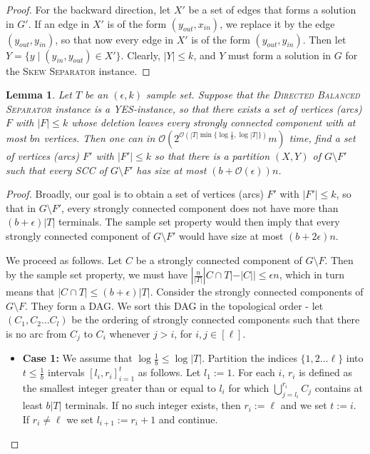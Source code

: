 \documentclass[11pt]{article}
\newtheorem{lemma}[theorem]{Lemma}
\newcommand{\OO}{\mathcal{O}}
\newcommand{\DB}{{\textsc{Directed Balanced Separator}}}
\newcommand{\SMC}{{\textsc{Skew Separator}}}
\begin{document}
{\begin{proof}
For the backward direction, let $X'$ be a set of edges that forms a solution in $G'$. If an edge in $X'$ is of the form $(y_{out}, x_{in})$, we replace it by the edge $(y_{out}, y_{in})$, so that now every edge in $X'$ is of the form $(y_{out}, y_{in})$. Then let $Y = \{y \mid (y_{in}, y_{out}) \in X'\}$. Clearly, $|Y| \leq k$, and $Y$ must form a solution in $G$ for the \SMC{} instance. 
\end{proof}







\begin{lemma}\label{lemma:aux}
Let $T$ be an $(\epsilon,k)$ sample set. Suppose that the \DB{} instance is a YES-instance, so that there exists a set of vertices (arcs) $F$ with $|F| \leq k$ whose deletion leaves every strongly connected component with at most $bn$ vertices. 
Then one can in $\OO(2^{\OO(|T|\min\{\log \frac{1}{b}, \log |T|\})}m)$ time, find a set of vertices (arcs) $F'$ with $|F'| \leq k$ so that there is a partition $(X,Y)$ of $G \setminus F'$ such that every SCC of $G \setminus F'$ has size at most $(b + \OO(\epsilon))n$.
\end{lemma}


\begin{proof}
Broadly, our goal is to obtain a set of vertices (arcs) $F'$ with $|F'| \leq k$, so that in $G \setminus F'$, every strongly connected component does not have more than $(b + \epsilon)|T|$ terminals. The sample set property would then imply that every strongly connected component of $G \setminus F'$ would have size at most $(b + 2\epsilon)n$.

We proceed as follows. Let $C$ be a strongly connected component of $G \setminus F$. Then by the sample set property, we must have $|\frac{n}{|T|}|C \cap T| - |C|| \leq \epsilon n$, which in turn means that $|C \cap T| \leq (b + \epsilon)|T|$. Consider the strongly connected components of $G \setminus F$. They form a DAG. We sort this DAG in the topological order - let $(C_1, C_2 \ldots C_l)$ be the ordering of strongly connected components such that there is no arc from $C_j$ to $C_i$ whenever $j > i$, for $i, j \in [\ell]$.

\begin{itemize}

\item \textbf{Case 1:} We assume that $\log \frac{1}{b} \leq \log |T|$. Partition the indices $\{1, 2 \ldots \ell\}$ into $t \leq \frac{1}{b}$ intervals $[l_i, r_i]^t_{i = 1}$ as follows. Let $l_1 := 1$. For each $i$, $r_i$ is defined as the smallest integer greater than or equal to $l_i$ for which $\bigcup_{j = l_i}^{r_i} C_j$ 
contains at least $b|T|$ terminals. If no such integer exists, then $r_i := \ell$ and we set $t:= i$. If $r_i \neq \ell$ we set $l_{i+1} := r_i + 1$ and continue.  


\end{itemize}
\end{proof}}
\end{document}
